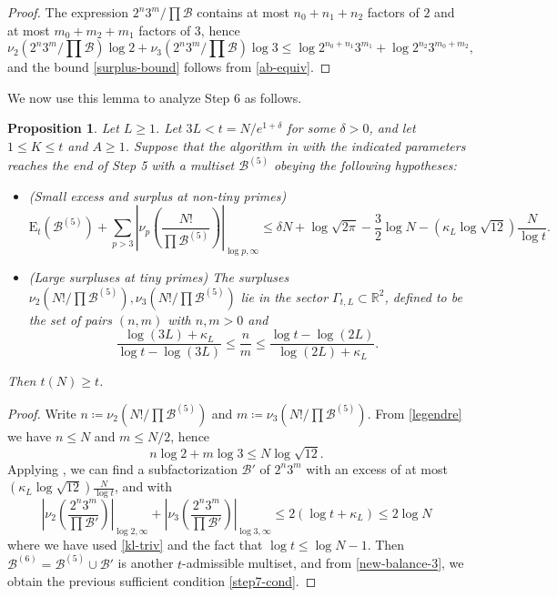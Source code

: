 \documentclass[12pt,a4paper,reqno]{amsart}
\numberwithin{equation}{section}
\theoremstyle{plain}
\newtheorem{proposition}[theorem]{Proposition}
\theoremstyle{definition}
\newcommand\R{\mathbb{R}}
\newcommand\tuple{{\mathcal B}}
\newcommand\excess{{\mathrm{E}}}
\begin{document}
\begin{proof}
  The expression $2^n 3^m / \prod \tuple$ contains at most $n_0+n_1+n_2$ factors of $2$ and at most $m_0+m_2+m_1$ factors of $3$, hence
  $$ \nu_2(2^n 3^m / \prod \tuple) \log 2 +
  \nu_3(2^n 3^m / \prod \tuple) \log 3
  \leq \log 2^{n_0+n_1} 3^{m_1} + \log 2^{n_2} 3^{m_0+m_2},$$
  and the bound \eqref{surplus-bound} follows from \eqref{ab-equiv}.
  \end{proof}
  
We now use this lemma to analyze Step 6 as follows.

\begin{proposition}\label{step6-reduce} Let $L \geq 1$.
  Let $3L < t = N/e^{1+\delta}$ for some $\delta>0$, and let $1 \leq K \leq t$ and $A \geq 1$.  Suppose that the algorithm in  with the indicated parameters reaches the end of Step 5 with a multiset $\tuple^{(5)}$ obeying the following hypotheses:
\begin{itemize}
  \item[(i)] (Small excess and surplus at non-tiny primes)
  \begin{equation}\label{new-balance-3}
    \excess_t(\tuple^{(5)}) + \sum_{p>3} \left|\nu_p\left(\frac{N!}{\prod \tuple^{(5)}}\right)\right|_{\log p,\infty} \leq \delta N + \log \sqrt{2\pi} - \frac{3}{2} \log N - (\kappa_L \log \sqrt{12}) \frac{N}{\log t}.
  \end{equation}
  \item[(ii)] (Large surpluses at tiny primes)
The surpluses $\nu_2(N!/\prod \tuple^{(5)}), \nu_3(N!/\prod \tuple^{(5)})$ lie in the sector $\Gamma_{t,L} \subset \R^2$, defined to be the set of pairs $(n,m)$ with $n,m > 0$ and
$$
\frac{\log(3L)+\kappa_L}{\log t - \log(3L)} \leq \frac{n}{m} \leq \frac{\log t - \log(2L)}{\log(2L)+\kappa_L}.
$$
\end{itemize}
Then $t(N) \geq t$.
\end{proposition}

  \begin{proof} Write $n \coloneqq \nu_2(N!/\prod \tuple^{(5)})$ and $m \coloneqq \nu_3(N!/\prod \tuple^{(5)})$.  From \eqref{legendre} we have $n \leq N$ and $m \leq N/2$, hence
    $$ n \log 2 + m \log 3 \leq N \log \sqrt{12}.$$
  Applying , we can find a subfactorization $\tuple'$ of $2^n 3^m$ with an excess of at most $(\kappa_L \log \sqrt{12}) \frac{N}{\log t}$, and with
  $$ \left|\nu_2\left(\frac{2^n 3^m}{\prod \tuple'}\right)\right|_{\log 2,\infty}
  + \left|\nu_3\left(\frac{2^n 3^m}{\prod \tuple'}\right)\right|_{\log 3,\infty}
   \leq 2(\log t + \kappa_L) \leq 2 \log N$$
   where we have used \eqref{kl-triv} and the fact that $\log t\leq \log N-1$.    Then $\tuple^{(6)} = \tuple^{(5)} \cup \tuple'$ is another $t$-admissible multiset, and from \eqref{new-balance-3}, we obtain the previous sufficient condition  \eqref{step7-cond}.
  \end{proof}
  
\end{document}
